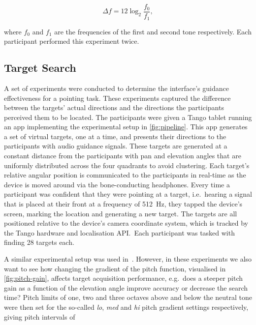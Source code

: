 \documentclass[acmsmall]{acmart}
\begin{document}
\begin{equation}
\label{eq:semitone-difference}
  \Delta f = 12\log_2\frac{f_0}{f_1}, 
\end{equation}

\noindent where $f_0$ and $f_1$ are the frequencies of the first and second tone respectively.
Each participant performed this experiment twice. 

\subsection{Target Search}\label{sec:target_search}

A set of experiments were conducted to determine the interface's guidance effectiveness for a pointing task.
These experiments captured the difference between the targets' actual directions and the directions the participants perceived them to be located. 
The participants were given a Tango tablet running an app implementing the experimental setup in \cref{fig:pipeline}.
This app generates a set of virtual targets, one at a time, and presents their directions to the participants with audio guidance signals.
These targets are generated at a constant distance from the participants with pan and elevation angles that are uniformly distributed across the four quadrants to avoid clustering.
Each target's relative angular position is communicated to the participants in real-time as the device is moved around via the bone-conducting headphones.
Every time a participant was confident that they were pointing at a target, i.e.\ hearing a signal that is placed at their front at a frequency of \SI{512}{\hertz}, they tapped the device's screen, marking the location and generating a new target.
The targets are all positioned relative to the device's camera coordinate system, which is tracked by the Tango hardware and localisation API.\
Each participant was tasked with finding 28 targets each.

A similar experimental setup was used in~\cite{lock2019bone}.
However, in these experiments we also want to see how changing the gradient of the pitch function, visualised in \cref{fig:pitch-gain}, affects target acquisition performance, e.g.\ does a steeper pitch gain as a function of the elevation angle improve accuracy or decrease the search time?
Pitch limits of one, two and three octaves above and below the neutral tone were then set for the so-called \textit{lo}, \textit{med} and \textit{hi} pitch gradient settings respectively, giving pitch intervals of
\end{document}
